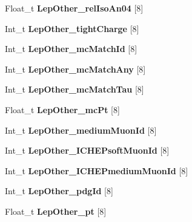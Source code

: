 \begin{DoxyCompactItemize}
\hypertarget{classMiniTree_a475aec305ea995406fc562882e0248d6}{}\label{classMiniTree_a475aec305ea995406fc562882e0248d6} 
Float\+\_\+t {\bfseries Lep\+Other\+\_\+rel\+Iso\+An04} \mbox{[}8\mbox{]}
\item 
\hypertarget{classMiniTree_a2957f6aa9d4901ab0e31994490eb65c7}{}\label{classMiniTree_a2957f6aa9d4901ab0e31994490eb65c7} 
Int\+\_\+t {\bfseries Lep\+Other\+\_\+tight\+Charge} \mbox{[}8\mbox{]}
\item 
\hypertarget{classMiniTree_aacb873f3dc6197125a7a1198e687da27}{}\label{classMiniTree_aacb873f3dc6197125a7a1198e687da27} 
Int\+\_\+t {\bfseries Lep\+Other\+\_\+mc\+Match\+Id} \mbox{[}8\mbox{]}
\item 
\hypertarget{classMiniTree_a7e440026bdf6027dac2c87f0a51ceac2}{}\label{classMiniTree_a7e440026bdf6027dac2c87f0a51ceac2} 
Int\+\_\+t {\bfseries Lep\+Other\+\_\+mc\+Match\+Any} \mbox{[}8\mbox{]}
\item 
\hypertarget{classMiniTree_ad6ef237d7ab68a9ee1b94f91c726e61e}{}\label{classMiniTree_ad6ef237d7ab68a9ee1b94f91c726e61e} 
Int\+\_\+t {\bfseries Lep\+Other\+\_\+mc\+Match\+Tau} \mbox{[}8\mbox{]}
\item 
\hypertarget{classMiniTree_afa0c2908c2f50cba50f6acf404274f56}{}\label{classMiniTree_afa0c2908c2f50cba50f6acf404274f56} 
Float\+\_\+t {\bfseries Lep\+Other\+\_\+mc\+Pt} \mbox{[}8\mbox{]}
\item 
\hypertarget{classMiniTree_ab16f0d287f9c279336b7acceed85547c}{}\label{classMiniTree_ab16f0d287f9c279336b7acceed85547c} 
Int\+\_\+t {\bfseries Lep\+Other\+\_\+medium\+Muon\+Id} \mbox{[}8\mbox{]}
\item 
\hypertarget{classMiniTree_a7c3cc009d5f9874543e026488525ea36}{}\label{classMiniTree_a7c3cc009d5f9874543e026488525ea36} 
Int\+\_\+t {\bfseries Lep\+Other\+\_\+\+I\+C\+H\+E\+Psoft\+Muon\+Id} \mbox{[}8\mbox{]}
\item 
\hypertarget{classMiniTree_a3383a0db30bd80e05d4a3eca3bf7dc01}{}\label{classMiniTree_a3383a0db30bd80e05d4a3eca3bf7dc01} 
Int\+\_\+t {\bfseries Lep\+Other\+\_\+\+I\+C\+H\+E\+Pmedium\+Muon\+Id} \mbox{[}8\mbox{]}
\item 
\hypertarget{classMiniTree_a91bbf648933bcecc00422e1792316bcb}{}\label{classMiniTree_a91bbf648933bcecc00422e1792316bcb} 
Int\+\_\+t {\bfseries Lep\+Other\+\_\+pdg\+Id} \mbox{[}8\mbox{]}
\item 
\hypertarget{classMiniTree_ae13e54213f4a0747d6ef60ceadba8db1}{}\label{classMiniTree_ae13e54213f4a0747d6ef60ceadba8db1} 
Float\+\_\+t {\bfseries Lep\+Other\+\_\+pt} \mbox{[}8\mbox{]}
\item 

\end{DoxyCompactItemize}
